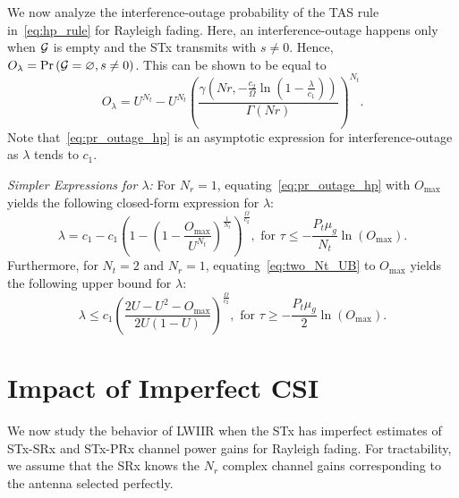 \documentclass[12pt,draftcls,peerreview,onecolumn]{IEEEtran}
\newcommand{\brac}[1]{\left({#1}\right)}
\newcommand{\prob}[1]{\text{Pr}\brac{#1}}
\newcommand{\nx}{{0}}
\newcommand{\lam}{\lambda}
\newcommand{\mug}{{\mu_{g}}}
\newcommand{\goodset}{\cal{G}}
\newcommand{\Nt}{{N_t}}
\newcommand{\Nr}{{N_r}}
\newcommand{\Pt}{{P_t}}
\newcommand{\outmax}{O_{\text{max}}}
\newcommand{\itau}{\tau}
\newcommand{\cone}{c_{1}}
\newcommand{\ctwo}{c_{2}}
\newcommand{\out}{O}
\newcommand{\m}{\cone}
\newcommand{\lambym}{\frac{\lam}{\m}}
\newcommand{\al}{\ctwo}
\newcommand{\snr}{\Omega}
\newcommand{\albysnr}[1][]{\frac{\al#1}{\snr}}
\newcommand{\snrbyal}[1][]{\frac{\snr#1}{\al}}
\newcommand{\un}{U}
\newcommand{\outlam}{\out_{\lam}}
\newcommand{\nullset}{\varnothing}
\begin{document}
We now analyze the interference-outage probability of the TAS rule in~\eqref{eq:hp_rule} for Rayleigh fading. Here, an interference-outage happens only when $\goodset$ is empty and the STx  transmits with $s\neq\nx$. Hence,  $\outlam=\prob{{\goodset}=\nullset, s \neq 0}$. This can be shown to be equal to
\begin{equation}
\label{eq:pr_outage_hp}
 \outlam = \un^{\Nt} - \un^{\Nt}\left( \frac{\gamma\left(Nr,-\albysnr[]\ln\left(1-\lambym\right)\right)}{\Gamma\left(Nr\right)}\right)^{\Nt}.
\end{equation}
Note that~\eqref{eq:pr_outage_hp} is an asymptotic expression for interference-outage  as $\lam$ tends to $\cone$.

{\em Simpler Expressions for $\lam$:} For $\Nr=1$, equating~\eqref{eq:pr_outage_hp} with $\outmax$ yields the following closed-form expression for $\lam$: 
\begin{equation}
\label{eq:lam_asym}
 \lam  =  \m - \m\left(1 - \left(1 - \frac{\outmax}{\un^{\Nt}}\right)^{\frac{1}{\Nt}} \right)^{\snrbyal[]}, \,\,\text{for}\,\, \itau\leq-\frac{\Pt\mug}{\Nt}\ln\left({\outmax}\right).
\end{equation}
%
Furthermore,  for $\Nt=2$ and $\Nr=1$, equating~\eqref{eq:two_Nt_UB} to $\outmax$ yields the following upper bound for $\lam$:
\begin{equation}
\label{eq:two_Nt_lam}
\lam \leq \cone \left( \frac{2\un - \un^2 - \outmax}{2\un(1-\un)} \right)^{\snrbyal[]} ,\,\,\text{for}\,\, \itau\geq-\frac{\Pt\mug}{2}\ln\left({\outmax}\right).
\end{equation} 



\section{Impact of Imperfect CSI}
\label{sec:imperfectcsi}
We now study the behavior of LWIIR when the STx has imperfect estimates of STx-SRx and STx-PRx channel power gains for Rayleigh fading. For tractability, we assume that the SRx knows the $\Nr$  complex channel gains corresponding to the antenna selected perfectly. %
\end{document}

